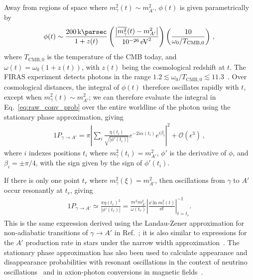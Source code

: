 \documentclass[prd,aps,10pt,nofootinbib,twocolumn,superscriptaddress,preprintnumbers,balancelastpage,longbibliography]{revtex4-1}
\begin{document}
Away from regions of space where $m_\gamma^2(t) \sim m_{A'}^2$, $\phi(t)$ is given parametrically by
%
\begin{alignat}{1}
    \phi(t) \sim \frac{\SI{200}{\per\kilo\parsec}}{1+z(t)} \left(\frac{\big|\overline{m_\gamma^2}(t) - m_{A'}^2 \big|}{\SI{e-26}{\eV^2}}\right) \left(\frac{10}{\omega_0/T_{\text{CMB},0}}\right) \,,
    \label{eq:phi_parametric}
\end{alignat}
%
where $T_{\text{CMB},0}$ is the temperature of the CMB today, and $\omega(t) = \omega_0(1+z(t))$, with $z(t)$ being the cosmological redshift at $t$. 
The FIRAS experiment detects photons in the range $1.2 \lesssim \omega_0 / T_{\text{CMB},0} \lesssim 11.3$~\cite{Fixsen:1996nj}.
Over cosmological distances, the integral of $\phi(t)$ therefore oscillates rapidly with $t$, except when $m_\gamma^2(t) \sim m_{A'}^2$; we can therefore evaluate the integral in Eq.~\eqref{eq:raw_conv_prob} over the entire worldline of the photon using the stationary phase approximation, giving
%
\begin{alignat}{1}
    P_{\gamma \to A'} = \pi \left|\sum_i \frac{\eta(t_i)}{\sqrt{|\phi'(t_i)|}} e^{-2i \alpha(t_i)} e^{i\beta_i} \right|^2 + \mathcal{O}(\epsilon^3) \,,
\end{alignat}
%
where $i$ indexes positions $t_i$ where $m_\gamma^2(t_i) = m_{A'}^2$, $\phi'$ is the derivative of $\phi$, and $\beta_i = \pm \pi / 4$, with the sign given by the sign of $\phi'(t_i)$.

If there is only one point $t_r$ where $m_\gamma^2(\xi) = m_{A'}^2$, then oscillations from $\gamma$ to $A'$ occur resonantly at $t_r$, giving
%
\begin{alignat}{1}
    P_{\gamma \to A'} \simeq \frac{\pi \eta(t_r)^2}{|\phi'(t_r)|} = \frac{\pi \epsilon^2 m_{A'}^2}{\omega(t_r)} \left| \frac{\dd \ln m_\gamma^2(t)}{\dd t} \right|^{-1}_{t = t_r} \!\!\! .
\end{alignat}
%
This is the same expression derived using the Landau-Zener approximation for non-adiabatic transitions of $\gamma \to A'$ in Ref.~\cite{Mirizzi:2009iz}; it is also similar to expressions for the $A'$ production rate in stars under the narrow width approximation~\cite{Hardy:2016kme,Redondo:2013lna}. 
The stationary phase approximation has also been used to calculate appearance and disappearance probabilities with resonant oscillations in the context of neutrino oscillations~\cite{Dasgupta:2005wn} and in axion-photon conversions in magnetic fields~\cite{Raffelt:1987im,Hook:2018iia,Battye:2019aco}. 
\end{document}
